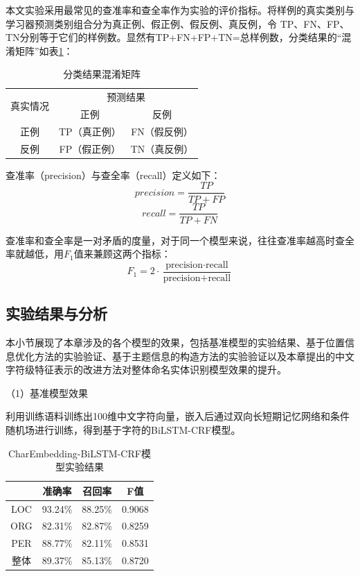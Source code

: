 \documentclass[winfonts,master,oneside,nobackinfo]{njuthesis}
\begin{document}
本文实验采用最常见的查准率和查全率作为实验的评价指标。将样例的真实类别与学习器预测类别组合分为真正例、假正例、假反例、真反例，令
TP、FN、FP、TN分别等于它们的样例数。显然有TP+FN+FP+TN=总样例数，分类结果的“混淆矩阵”如表\ref{mix-matrix}：

\begin{table}[h]
\centering
\begin{tabular}{|c|c|c|}
\hline
\multirow{2}{*}{真实情况} & \multicolumn{2}{c|}{预测结果} \\ \cline{2-3} 
                      & 正例          & 反例          \\ \hline
正例                    & TP（真正例）     & FN（假反例）     \\ \hline
反例                    & FP（假正例）     & TN（真反例）     \\ \hline
\end{tabular}
\caption{分类结果混淆矩阵}
\label{mix-matrix}
\end{table}

查准率（precision）与查全率（recall）定义如下：
\begin{equation}
precision =\frac{T P}{T P+F P}
\end{equation}
\begin{equation}
recall=\frac{T P}{T P+F N}
\end{equation}

查准率和查全率是一对矛盾的度量，对于同一个模型来说，往往查准率越高时查全率就越低，用$F_{1}$值来兼顾这两个指标：
\begin{equation}
F_{1}=2 \cdot \frac{\text {precision} \cdot \text {recall}}{\text {precision}+\text {recall}}
\end{equation}

\subsection{实验结果与分析}

本小节展现了本章涉及的各个模型的效果，包括基准模型的实验结果、基于位置信息优化方法的实验验证、基于主题信息的构造方法的实验验证以及本章提出的中文字符级特征表示的改进方法对整体命名实体识别模型效果的提升。

（1）基准模型效果

利用训练语料训练出100维中文字符向量，嵌入后通过双向长短期记忆网络和条件随机场进行训练，得到基于字符的BiLSTM-CRF模型。

\begin{table}[h]
\centering
\begin{tabular}{|c|c|c|c|}
\hline
    & 准确率     & 召回率     & F值    \\ \hline
LOC & 93.24\% & 88.25\% & 0.9068 \\ \hline
ORG & 82.31\% & 82.87\% & 0.8259 \\ \hline
PER & 88.77\% & 82.11\% & 0.8531 \\ \hline
整体  & 89.37\% & 85.13\% & 0.8720 \\ \hline
\end{tabular}
\caption{CharEmbedding-BiLSTM-CRF模型实验结果}
\end{table}
\end{document}
